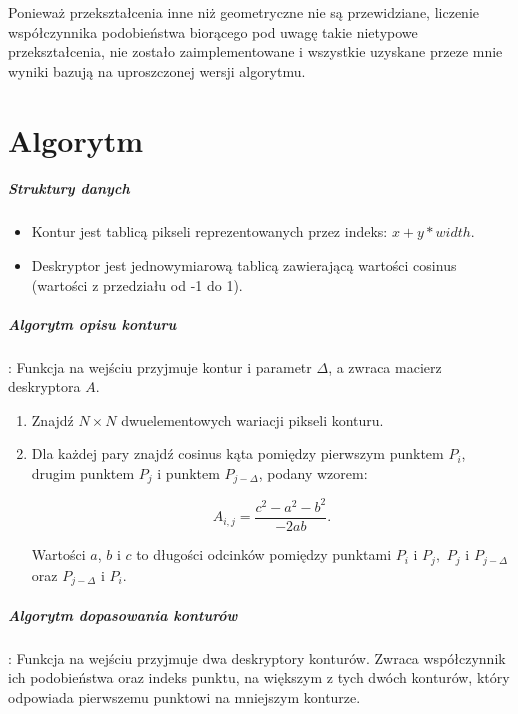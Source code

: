 Ponieważ przekształcenia inne niż geometryczne nie są przewidziane, liczenie
współczynnika podobieństwa biorącego pod uwagę takie nietypowe przekształcenia,
nie zostało zaimplementowane i wszystkie uzyskane przeze mnie wyniki bazują na
uproszczonej wersji algorytmu.

\section{Algorytm}

\subparagraph{Struktury danych} 

\begin{itemize} \item Kontur jest tablicą pikseli reprezentowanych przez
    indeks: $x + y*width$. \item Deskryptor jest jednowymiarową tablicą
    zawierającą wartości cosinus (wartości z przedziału od -1 do 1).
\end{itemize}

\subparagraph{Algorytm opisu konturu}: Funkcja na wejściu przyjmuje kontur i
parametr $\Delta$, a zwraca macierz deskryptora $A$.  

\begin{enumerate} \item Znajdź $N \times N$ dwuelementowych wariacji pikseli
    konturu. \item Dla każdej pary znajdź cosinus kąta pomiędzy pierwszym
    punktem $P_{i}$, drugim punktem $P_{j}$ i punktem $P_{j-\Delta}$, podany
    wzorem: 

\begin{equation}
  A_{i,j} = \frac{c^2 - a^2 - b^2}{-2ab}.
\end{equation}

 Wartości $a$, $b$ i $c$ to długości odcinków pomiędzy punktami $P_i$ i $P_j,$
 $P_j$ i $P_{j-\Delta}$ oraz $P_{j-\Delta}$ i $P_i$. \end{enumerate}

\subparagraph{Algorytm dopasowania konturów}: Funkcja na wejściu przyjmuje dwa
deskryptory konturów. Zwraca współczynnik ich podobieństwa oraz indeks punktu,
na większym z tych dwóch konturów, który odpowiada pierwszemu punktowi na
mniejszym konturze.

